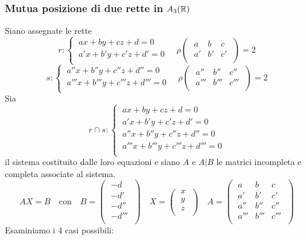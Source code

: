 \subsubsection{Mutua posizione di due rette in \(A_3(\RR )\)}
Siano assegnate le rette \[
r :
\begin{cases}
    \ ax + by + cz + d = 0 \\
    \ a'x + b'y + c'z + d' = 0 \\
\end{cases} \quad \rho
\left( \; \begin{matrix}
    a & b & c \\
    a' & b' & c' \\
\end{matrix} \; \right) = 2
\] \[
s :
\begin{cases}
    \ a ''x + b ''y + c ''z + d '' = 0 \\
    \ a'''x + b'''y + c'''z + d''' = 0 \\
\end{cases} \quad \rho
\left( \; \begin{matrix}
    a ''& b '' & c ''\\
    a''' & b''' & c''' \\
\end{matrix} \; \right) = 2
\] Sia \[
r \cap s:
\begin{cases}
    \ ax + by + cz + d = 0 \\
    \ a'x + b'y + c'z + d' = 0 \\
    \ a ''x + b ''y + c ''z + d '' = 0 \\
    \ a'''x + b'''y + c'''z + d''' = 0 \\
\end{cases}
\] il sistema costituito dalle loro equazioni e siano \(A\) e \(A|B\) le matrici incompleta e completa associate al sistema. \[
AX = B \quad \text{con} \quad B =
\left( \; \begin{matrix}
    -d \\
    -d' \\
    -d'' \\
    -d''' \\
\end{matrix} \; \right) 
\quad X = 
\left( \; \begin{matrix}
    x \\
    y \\
    z \\
\end{matrix} \; \right) 
\quad A =
\left( \; \begin{matrix}
    a & b & c \\
    a' & b' & c' \\
    a '' & b '' & c '' \\
    a''' & b''' & c''' \\
\end{matrix} \; \right) 
\] Esaminiamo i 4 casi possibili:


